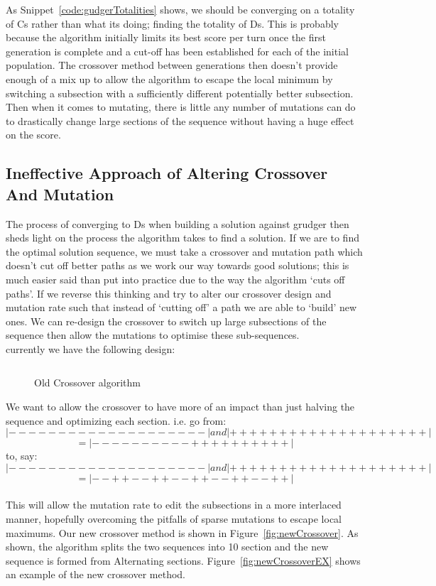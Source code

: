 As Snippet~\ref{code:gudgerTotalities} shows, we should be converging on a totality of Cs rather than what its doing;
finding the totality of Ds.
This is probably because the algorithm initially limits its best score per turn once the first generation is complete and a cut-off has been established for each of the initial population.
The crossover method between generations then doesn't provide enough of a mix up to allow the algorithm to escape the local minimum by switching a subsection with a sufficiently different potentially better subsection.
Then when it comes to mutating, there is little any number of mutations can do to drastically change large sections of the sequence without having a huge effect on the score.\\

\subsection{Ineffective Approach of Altering Crossover And Mutation}\label{subsec:ineffectiveApproachOfAlteringCrossoverAndMutation}
The process of converging to Ds when building a solution against grudger then sheds light on the process the algorithm takes to find a solution.
If we are to find the optimal solution sequence, we must take a crossover and mutation path which doesn't cut off better paths as we work our way towards good solutions;
this is much easier said than put into practice due to the way the algorithm `cuts off paths'.
If we reverse this thinking and try to alter our crossover design and mutation rate such that instead of `cutting off' a path we are able to `build' new ones.
We can re-design the crossover to switch up large subsections of the sequence then allow the mutations to optimise these sub-sequences.\\

currently we have the following design:

\begin{figure}
    \inputminted{python}{code_snippets/oldCrossover.py}
    \caption{Old Crossover algorithm}\label{fig:oldCrossover}
\end{figure}

We want to allow the crossover to have more of an impact than just halving the sequence and optimizing each section. i.e. go from:\\
\[|--------------------| and |++++++++++++++++++++|\]
\[= |----------++++++++++|\]
to, say:\\
\[|--------------------| and |++++++++++++++++++++|\]
\[= |--++--++--++--++--++|\]\\
This will allow the mutation rate to edit the subsections in a more interlaced manner, hopefully overcoming the pitfalls of sparse mutations to escape local maximums.
Our new crossover method is shown in Figure~\ref{fig:newCrossover}.
As shown, the algorithm splits the two sequences into 10 section and the new sequence is formed from Alternating sections.
Figure~\ref{fig:newCrossoverEX} shows an example of the new crossover method.\\

